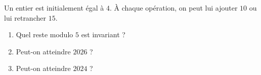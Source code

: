 Un entier est initialement égal à $4$. À chaque opération, on peut lui
ajouter $10$ ou lui retrancher $15$.
\begin{enumerate}
  \item Quel reste modulo $5$ est invariant ?
  \item Peut-on atteindre $2026$ ?
  \item Peut-on atteindre $2024$ ?
\end{enumerate}
